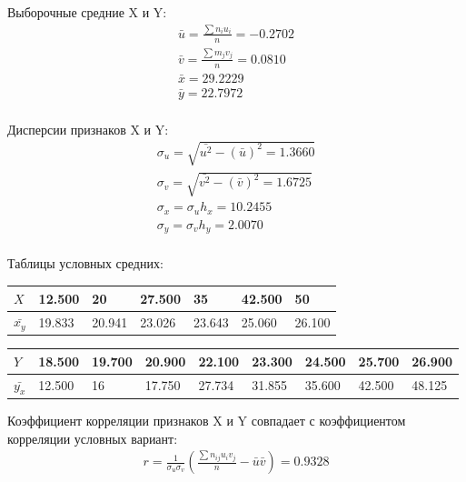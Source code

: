 Выборочные средние X и Y:
\begin{gather*}
    \bar{u} = \frac{\sum n_i u_i}{n} = -0.2702\\
    \bar{v} = \frac{\sum m_j v_j}{n} = 0.0810\\
    \bar{x} = 29.2229\\
    \bar{y} = 22.7972\\
\end{gather*}

Дисперсии признаков X и Y:
\begin{gather*}
    \sigma_u = \sqrt{\bar{u^2} - (\bar{u}) ^ 2 = 1.3660}\\
    \sigma_v = \sqrt{\bar{v^2} - (\bar{v}) ^ 2 = 1.6725}\\
    \sigma_x = \sigma_u h_x = 10.2455\\
    \sigma_y = \sigma_v h_y = 2.0070\\
\end{gather*}


Таблицы условных средних:
\begin{table}[H]
    \begin{center}
        \begin{tabular}{|l|l|l|l|l|l|l|}
            \hline
            $X$         & 12.500 & 20     & 27.500 & 35     & 42.500 & 50     \\
            \hline
            $\bar{x_y}$ & 19.833 & 20.941 & 23.026 & 23.643 & 25.060 & 26.100 \\
            \hline
        \end{tabular}
    \end{center}
\end{table}

\begin{table}[H]
    \begin{center}
        \begin{tabular}{|l|l|l|l|l|l|l|l|l|}
            \hline
            $Y$         & 18.500 & 19.700 & 20.900 & 22.100 & 23.300 & 24.500 & 25.700 & 26.900 \\
            \hline
            $\bar{y_x}$ & 12.500 & 16     & 17.750 & 27.734 & 31.855 & 35.600 & 42.500 & 48.125 \\
            \hline
        \end{tabular}
    \end{center}
\end{table}

Коэффициент корреляции признаков X и Y совпадает с коэффициентом корреляции условных вариант:
\begin{gather*}
    r = \frac{1}{\sigma_u \sigma_v}(\frac{\sum n_{ij} u_i v_j}{n} - \bar{u} \bar{v}) = 0.9328\\
\end{gather*}

